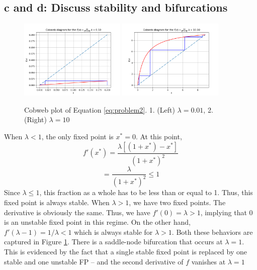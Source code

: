 \documentclass[english]{article}
\begin{document}
\subsection*{c and d: Discuss stability and bifurcations}
\begin{figure}[H]
	\centering
	\includegraphics[width=0.45\textwidth]{plots/problem2_lambda_0p01.png}
	\includegraphics[width=0.45\textwidth]{plots/problem2_lambda_10.png}
	\caption{Cobweb plot of Equation \ref{eq:problem2}. 1. (Left) $\lambda = 0.01$, 
	2. (Right) $\lambda = 10$}
	\label{fig:problem2c}
\end{figure}
When $\lambda < 1$, the only fixed point is $x^{*}=0$. At this point,
$$ f'(x^{*}) = \frac{\lambda \left[(1+x^{*})-x^{*}\right]}{(1+x^{*})^{2}} $$
$$ = \frac{\lambda}{(1+x^{*})^{2}} \leq 1$$
Since $\lambda \leq 1$, this fraction as a whole has to be less than or equal
to 1. Thus, this fixed point is always stable.
When $\lambda > 1$, we have two fixed points. The derivative is obviously the
same. Thus, we have $f'(0) = \lambda > 1$, implying that 0 is an unstable fixed
point in this regime. On the other hand, $f'(\lambda-1) = 1/\lambda < 1$  which is 
always stable for $\lambda>1$. Both these behaviors are captured in Figure 
\ref{fig:problem2c}. There is a saddle-node bifurcation that occurs at $\lambda =1$.
This is evidenced by the fact that a single stable fixed point is replaced by one
stable and one unstable FP -- and the second derivative of $f$ vanishes at 
$\lambda =1$
\end{document}
